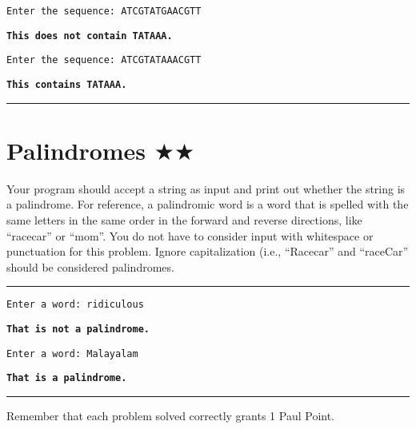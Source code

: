 \documentclass[12pt, letterpaper]{article}
\begin{document}
\texttt{Enter the sequence: ATCGTATGAACGTT}

\texttt{\bfseries This does not contain TATAAA.}

\texttt{Enter the sequence: ATCGTATAAACGTT}

\texttt{\bfseries This contains TATAAA.}

\vspace{2mm}\hrule\vspace{2mm}


\section{\upshape Palindromes $\bigstar\bigstar$}
Your program should accept a string as input and print out whether the string is a palindrome. For reference, a palindromic word is a word that is spelled with the same letters in the same order in the forward and reverse directions, like ``racecar'' or ``mom''. You do not have to consider input with whitespace or punctuation for this problem. Ignore capitalization (i.e., ``Racecar'' and ``raceCar'' should be considered palindromes.

\vspace{2mm}\hrule\vspace{2mm}

\texttt{Enter a word: ridiculous}

\texttt{\bfseries That is not a palindrome.}

\texttt{Enter a word: Malayalam}

\texttt{\bfseries That is a palindrome.}

\vspace{2mm}\hrule\vspace{2mm}

Remember that each problem solved correctly grants 1 Paul Point.
\end{document}
